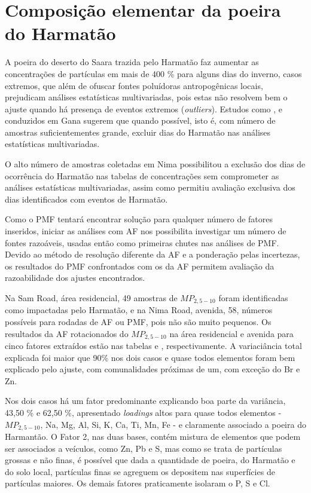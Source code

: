 \newpage
\section{Composição elementar da poeira do Harmatão}

A poeira do deserto do Saara trazida pelo Harmatão faz aumentar as concentrações
de partículas em mais de 400 \% para alguns dias do inverno, casos extremos, 
que além de ofuscar fontes poluídoras antropogênicas locais, prejudicam 
análises estatísticas multivariadas, pois estas não resolvem bem o ajuste 
quando há presença de eventos extremos (\textit{outliers}). Estudos como 
\citet{aboh2009}, \citet{ofosu2013} e \citet{ofosu2012} conduzidos em Gana 
sugerem que quando possível, isto é, com número de amostras suficientementes 
grande, excluir dias do Harmatão nas análises estatísticas multivariadas.

O alto número de amostras coletadas em Nima possibilitou a exclusão dos dias de 
ocorrência do Harmatão nas tabelas de concentrações sem comprometer as análises
estatísticas multivariadas, assim como permitiu avaliação exclusiva dos dias
identificados com eventos de Harmatão. 

Como o PMF tentará encontrar solução para qualquer número de fatores inseridos, 
iniciar as análises com AF nos possibilita investigar um número de fontes 
razoáveis, usadas então como primeiras chutes nas análises de PMF. Devido 
ao método de resolução diferente da AF e a ponderação pelas incertezas, os
resultados do PMF confrontados com os da AF permitem avaliação da 
razoabilidade dos ajustes encontrados. 

Na Sam Road, área residencial, 49 amostras de $MP_{2,5-10}$ foram identificadas 
como impactadas pelo Harmatão, e na Nima Road, avenida, 58, números possíveis 
para rodadas de AF ou PMF, pois não são muito pequenos. Os resultados 
da AF rotacionados do $MP_{2,5-10}$ na área residencial e avenida para cinco 
fatores extraídos 
estão nas tabelas \label{table:AF_RGeH5} e \label{table:AF_TGeH5}, 
respectivamente. A variaciância total explicada foi maior que 90\% nos dois  
casos e quase todos elementos foram bem explicado pelo ajuste, com comunalidades 
próximas de um, com exceção do Br e Zn. 

Nos dois casos há um fator predominante explicando boa parte da variância,
43,50 \% e 62,50 \%, apresentado \textit{loadings} altos para quase todos  
elementos - $MP_{2,5-10}$, Na, Mg, Al, Si, K, Ca, Ti, Mn, Fe - 
e claramente associado a poeira do Harmantão. 
O Fator 2, nas duas bases, contém mistura de elementos que podem ser associados 
a veículos, como Zn, Pb e S, mas como se trata de partículas grossas e não finas, 
é possível que dada a quantidade de poeira, do Harmatão e do solo local, 
partículas finas se agreguem os depositem nas superfícies de partículas maiores. 
Os demais fatores praticamente isolaram o P, S e Cl. 

